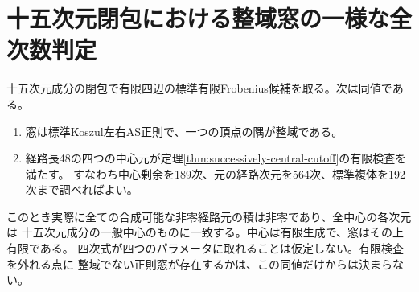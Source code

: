\section{十五次元閉包における整域窓の一様な全次数判定}
\label{sec:finite-domain-specialization-parameters}
\begin{theorem}\label{thm:finite-domain-specialization-parameters}
十五次元成分の閉包で有限四辺の標準有限Frobenius候補を取る。次は同値である。
\begin{enumerate}
\item 窓は標準Koszul左右AS正則で、一つの頂点の隅が整域である。
\item 経路長48の四つの中心元が定理\ref{thm:successively-central-cutoff}の有限検査を満たす。
すなわち中心剰余を189次、元の経路次元を564次、標準複体を192次まで調べればよい。
\end{enumerate}
このとき実際に全ての合成可能な非零経路元の積は非零であり、全中心の各次元は
十五次元成分の一般中心のものに一致する。中心は有限生成で、窓はその上有限である。
四次式が四つのパラメータに取れることは仮定しない。有限検査を外れる点に
整域でない正則窓が存在するかは、この同値だけからは決まらない。
\end{theorem}
